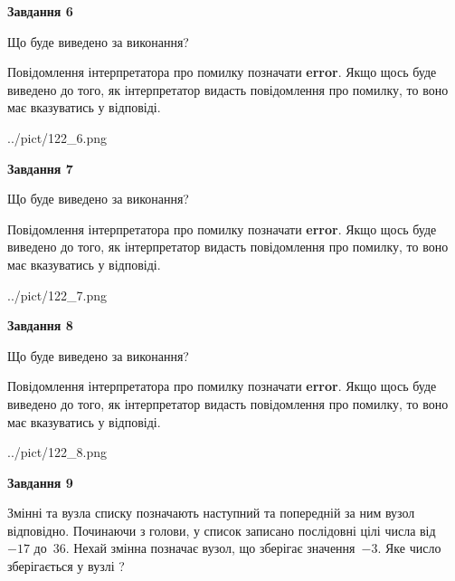 \documentclass[12pt, ukrainian]{article}
\begin{document}
{\begin {large}
{\begin {center}\textbf{Завдання 6}\end {center}}\par
Що буде виведено за виконання?

Повідомлення інтерпретатора про помилку позначати \textbf{error}.
Якщо щось буде виведено до того, як інтерпретатор видасть повідомлення про помилку, 
то воно має вказуватись у відповіді. \par


\begin{center}
	{../pict/122_6.png}
\end{center}
\newpage

{\begin {center}\textbf{Завдання 7}\end {center}}\par
Що буде виведено за виконання?

Повідомлення інтерпретатора про помилку позначати \textbf{error}.
Якщо щось буде виведено до того, як інтерпретатор видасть повідомлення про помилку, 
то воно має вказуватись у відповіді. \par


\begin{center}
	{../pict/122_7.png}
\end{center}
\newpage

{\begin {center}\textbf{Завдання 8}\end {center}}\par
Що буде виведено за виконання?

Повідомлення інтерпретатора про помилку позначати \textbf{error}.
Якщо щось буде виведено до того, як інтерпретатор видасть повідомлення про помилку, 
то воно має вказуватись у відповіді. \par


\begin{center}
	{../pict/122_8.png}
\end{center}
\newpage

{\begin {center}\textbf{Завдання 9}\end {center}}\par
Змінні  та  вузла списку позначають наступний та попередній за ним вузол відповідно. Починаючи з голови, у список записано послідовні цілі числа від~$-17$ до~$36$. Нехай змінна  позначає вузол, що зберігає значення~$-3$.
Яке число зберігається у вузлі  ?\par
\newpage


\end{large}}
\end{document}
